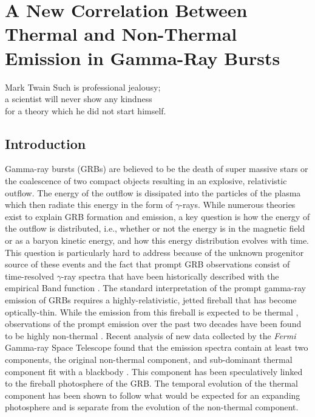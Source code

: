 \chapter{A New Correlation Between Thermal and Non-Thermal Emission in Gamma-Ray Bursts} 
\label{ch:cor}
\begin{chapterquote}{Mark Twain}
Such is professional jealousy;\\ a scientist will never show any kindness\\ for a theory which he did not start himself.
\end{chapterquote}

\section{Introduction}

Gamma-ray bursts (GRBs) are believed to be the death of super massive
stars or the coalescence of two compact objects resulting in an
explosive, relativistic outflow. The energy of the outflow is
dissipated into the particles of the plasma which then radiate this
energy in the form of $\gamma$-rays. While numerous theories exist to
explain GRB formation and emission, a key question is how the energy
of the outflow is distributed, i.e., whether or not the energy is in
the magnetic field or as a baryon kinetic energy, and how this energy
distribution evolves with time. This question is particularly hard to
address because of the unknown progenitor source of these events and
the fact that prompt GRB observations consist of time-resolved
$\gamma$-ray spectra that have been historically described with the
empirical Band function
\cite{band:1993,Kaneko:2006,Goldstein:2012}. The standard
interpretation of the prompt gamma-ray emission of GRBs requires a
highly-relativistic, jetted fireball that has become
optically-thin. While the emission from this fireball is expected to
be thermal \cite{Goodman:1986,Paczynski:1986}, observations of the
prompt emission over the past two decades have been found to be highly
non-thermal
\cite{Mazets:1981,Fenimore:1982,matz,Kaneko:2006,Goldstein:2012}. Recent
analysis of new data collected by the {\it Fermi} Gamma-ray Space
Telescope found that the emission spectra contain at least two
components, the original non-thermal component, and sub-dominant
thermal component fit with a blackbody
\cite{Guiriec:2010,Axelsson:2012}. This component has been
speculatively linked to the fireball photosphere of the GRB. The
temporal evolution of the thermal component has been shown to follow
what would be expected for an expanding photosphere and is separate
from the evolution of the non-thermal component.

